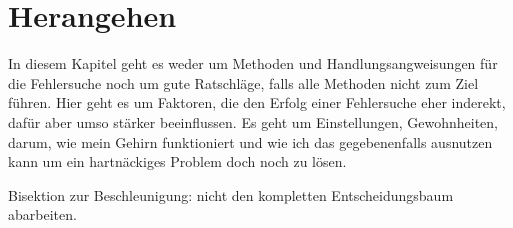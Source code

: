 \chapter{Herangehen}
\label{cha:herangehen}

\begin{abstractsec}
  In diesem Kapitel geht es weder um Methoden und Handlungsangweisungen für
  die Fehlersuche noch um gute Ratschläge, falls alle Methoden nicht zum Ziel
  führen. Hier geht es um Faktoren, die den Erfolg einer Fehlersuche eher
  inderekt, dafür aber umso stärker beeinflussen. Es geht um Einstellungen,
  Gewohnheiten, darum, wie mein Gehirn funktioniert und wie ich das
  gegebenenfalls ausnutzen kann um ein hartnäckiges Problem doch noch zu
  lösen.
\end{abstractsec}

\begin{notes}
\item Bisektion zur Beschleunigung: nicht den kompletten Entscheidungsbaum
  abarbeiten.
\end{notes}






